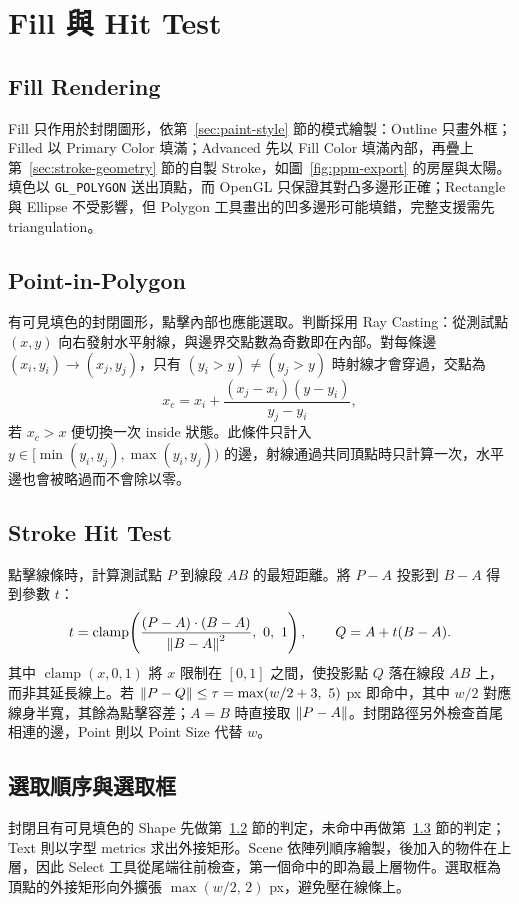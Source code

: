 \section{Fill 與 Hit Test}

\subsection{Fill Rendering}
\label{sec:fill-rendering}

Fill 只作用於封閉圖形，依第~\ref{sec:paint-style} 節的模式繪製：Outline 只畫外框；Filled 以 Primary Color 填滿；Advanced 先以 Fill Color 填滿內部，再疊上第~\ref{sec:stroke-geometry} 節的自製 Stroke，如圖~\ref{fig:ppm-export} 的房屋與太陽。填色以 \lstinline|GL_POLYGON| 送出頂點，而 OpenGL 只保證其對凸多邊形正確；Rectangle 與 Ellipse 不受影響，但 Polygon 工具畫出的凹多邊形可能填錯，完整支援需先 triangulation。

\subsection{Point-in-Polygon}
\label{sec:point-in-polygon}

有可見填色的封閉圖形，點擊內部也應能選取。判斷採用 Ray Casting：從測試點 $(x,y)$ 向右發射水平射線，與邊界交點數為奇數即在內部。對每條邊 $(x_i,y_i)\to(x_j,y_j)$，只有 $(y_i>y)\ne(y_j>y)$ 時射線才會穿過，交點為
\[
    x_c=x_i+\frac{(x_j-x_i)(y-y_i)}{y_j-y_i},
\]
若 $x_c>x$ 便切換一次 inside 狀態。此條件只計入 $y\in[\min(y_i,y_j),\max(y_i,y_j))$ 的邊，射線通過共同頂點時只計算一次，水平邊也會被略過而不會除以零。

\subsection{Stroke Hit Test}
\label{sec:stroke-hit-test}

點擊線條時，計算測試點 $P$ 到線段 $AB$ 的最短距離。將 $P-A$ 投影到 $B-A$ 得到參數 $t$：
\[
    t=\operatorname{clamp}\!\left(\frac{(P-A)\cdot(B-A)}{\norm{B-A}^2},\ 0,\ 1\right),\qquad Q=A+t(B-A).
\]
其中 $\operatorname{clamp}(x,0,1)$ 將 $x$ 限制在 $[0,1]$ 之間，使投影點 $Q$ 落在線段 $AB$ 上，而非其延長線上。若 $\left\| P-Q \right\|\le\tau=\max(w/2+3,\ 5)$ px 即命中，其中 $w/2$ 對應線身半寬，其餘為點擊容差；$A=B$ 時直接取 $\left\| P-A \right\|$。封閉路徑另外檢查首尾相連的邊，Point 則以 Point Size 代替 $w$。

\subsection{選取順序與選取框}

封閉且有可見填色的 Shape 先做第~\ref{sec:point-in-polygon} 節的判定，未命中再做第~\ref{sec:stroke-hit-test} 節的判定；Text 則以字型 metrics 求出外接矩形。Scene 依陣列順序繪製，後加入的物件在上層，因此 Select 工具從尾端往前檢查，第一個命中的即為最上層物件。選取框為頂點的外接矩形向外擴張 $\max(w/2,\,2)$ px，避免壓在線條上。
